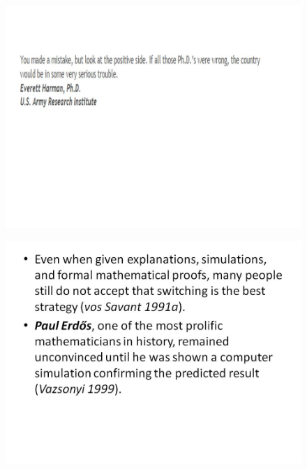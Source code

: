 \documentclass{beamer}
\begin{document}
\begin{frame}
	\begin{figure}
		\centering
		\includegraphics[width=1.16\linewidth]{MontyHall/Slide13}
	\end{figure}
	
\end{frame}
\begin{frame}
	\begin{figure}
		\centering
		\includegraphics[width=1.17\linewidth]{MontyHall/Slide14}

	\end{figure}
	
\end{frame}
\end{document}
